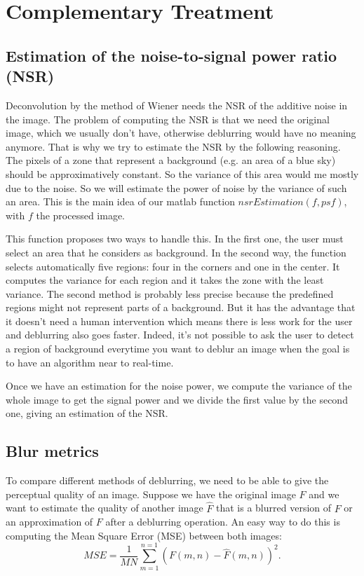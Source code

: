 \section{Complementary Treatment}
\label{sec:CompTr}
\subsection{Estimation of the noise-to-signal power ratio (NSR)}
\label{subsec:NSREstimation}
Deconvolution by the method of Wiener needs the NSR of the additive noise in the image. The problem of computing the NSR is that we need the original image, which we usually don't have, otherwise deblurring would have no meaning anymore. That is why we try to estimate the NSR by the following reasoning. The pixels of a zone that represent a background (e.g. an area of a blue sky) should be approximatively constant. So the variance of this area would me mostly due to the noise. So we will estimate the power of noise by the variance of such an area. This is the main idea of our matlab function $nsrEstimation(f,psf)$, with $f$ the processed image. %

This function proposes two ways to handle this. In the first one, the user must select an area that he considers as background. In the second way, the function selects automatically five regions: four in the corners and one in the center. It computes the variance for each region and it takes the zone with the least variance. The second method is probably less precise because the predefined regions might not represent parts of a background. But it has the advantage that it doesn't need a human intervention which means there is less work for the user and deblurring also goes faster. Indeed, it's not possible to ask the user to detect a region of background everytime you want to deblur an image when the goal is to have an algorithm near to real-time.

Once we have an estimation for the noise power, we compute the variance of the whole image to get the signal power and we divide the first value by the second one, giving an estimation of the NSR.


\subsection{Blur metrics}

To compare different methods of deblurring, we need to be able to give the perceptual quality of an image. Suppose we have the original image $F$ and we want to estimate the quality of another image $\hat{F}$ that is a blurred version of $F$ or an approximation of $F$ after a deblurring operation. An easy way to do this is computing the Mean Square Error (MSE) between both images:
\begin{equation}
MSE=\frac{1}{MN} \sum\limits_{m=1}^{n=1}\left(F(m,n)-\hat{F}(m,n)\right)^2.
\end{equation}

